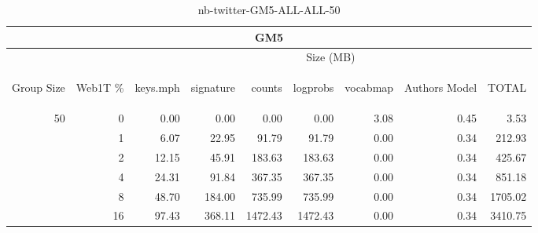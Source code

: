 \begin{center}
\begin{table}[htbp]
\begin{tabular}{ | r | r | r | r | r | r | r | r | r |}
\hline
\multicolumn{9}{|c|}{GM5}\\
\hline
 & & \multicolumn{7}{|c|}{Size (MB)}\\ \cline{3-9}
\begin{sideways}Group Size\end{sideways} & \begin{sideways}Web1T \% \end{sideways} & \begin{sideways}keys.mph\end{sideways} & \begin{sideways}signature\end{sideways} & \begin{sideways}counts\end{sideways} & \begin{sideways}logprobs\end{sideways} & \begin{sideways}vocabmap\end{sideways} & \begin{sideways}Authors Model \end{sideways} & \begin{sideways}TOTAL\end{sideways}\\
\hline
\multirow{5}{*}{50}
 & 0 & 0.00 & 0.00 & 0.00 & 0.00 & 3.08 & 0.45 & 3.53\\ \cline{2-9}
 & 1 & 6.07 & 22.95 & 91.79 & 91.79 & 0.00 & 0.34 & 212.93\\ \cline{2-9}
 & 2 & 12.15 & 45.91 & 183.63 & 183.63 & 0.00 & 0.34 & 425.67\\ \cline{2-9}
 & 4 & 24.31 & 91.84 & 367.35 & 367.35 & 0.00 & 0.34 & 851.18\\ \cline{2-9}
 & 8 & 48.70 & 184.00 & 735.99 & 735.99 & 0.00 & 0.34 & 1705.02\\ \cline{2-9}
 & 16 & 97.43 & 368.11 & 1472.43 & 1472.43 & 0.00 & 0.34 & 3410.75\\ \cline{2-9}
\hline
\end{tabular}
\caption{nb-twitter-GM5-ALL-ALL-50}
\label{table:nb-twitter-GM5-ALL-ALL-50}
\end{table}
\end{center}

